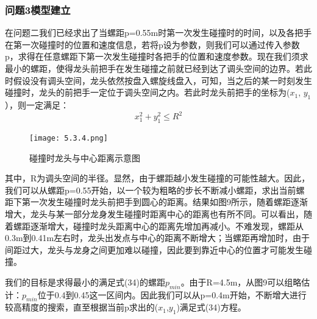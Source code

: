 \documentclass{cumcmthesis1}
\begin{document}
\subsubsection{\textbf{问题3}模型建立}
在问题二我们已经求出了当螺距p=0.55m时第一次发生碰撞时的时间，以及各把手在第一次碰撞时的位置和速度信息，若将p设为参数，则我们可以通过传入参数p，求得在任意螺距下第一次发生碰撞时各把手的位置和速度参数。现在我们须求最小的螺距，使得龙头前把手在发生碰撞之前就已经到达了调头空间的边界。若此时假设没有调头空间，龙头依然按盘入螺旋线盘入，可知，当之后的某一时刻发生碰撞时，龙头的前把手一定位于调头空间之内。若此时龙头前把手的坐标为($x_1$, $y_1$），则一定满足：
\begin{equation}
    x_1^2 + y_1^2 \leq R^2
\end{equation}
\begin{figure}
    \caption{碰撞时龙头与中心距离示意图}
    \centering    
    \texttt{[image: 5.3.4.png]}
\end{figure}
其中，R为调头空间的半径。显然，由于螺距越小发生碰撞的可能性越大。因此，我们可以从螺距p=0.55开始，以一个较为粗略的步长不断减小螺距，求出当前螺距下第一次发生碰撞时龙头前把手到圆心的距离。结果如图9所示，随着螺距逐渐增大，龙头与某一部分龙身发生碰撞时距离中心的距离也有所不同。可以看出，随着螺距逐渐增大，碰撞时龙头距离中心的距离先增加再减小。不难发现，螺距从0.3m到0.41m左右时，龙头出发点与中心的距离不断增大；当螺距再增加时，由于间距过大，龙头与龙身之间更加难以碰撞，因此要到靠近中心的位置才可能发生碰撞。
\par
我们的目标是求得最小的满足式(34)的螺距$p_{min}$。由于R=4.5m，从图9可以组略估计：$p_{min}$位于0.4到0.45这一区间内。因此我们可以从p=0.4m开始，不断增大进行较高精度的搜索，直至根据当前p求出的($x_1$,$y_1$)满足式(34)方程。
\par
\end{document}
